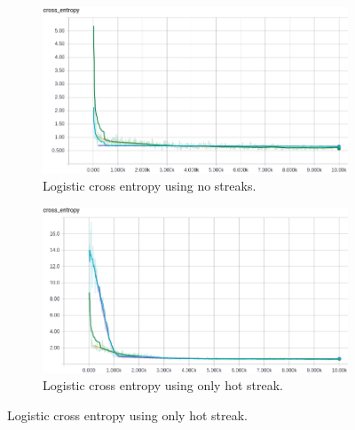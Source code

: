 \documentclass{article} %
\begin{document}
\begin{figure}[!htb]
  \begin{subfigure}{0.5\textwidth}
    \includegraphics[width=\linewidth]{plots/linear-model/streak-/crossentropy.png}
    \caption{Logistic cross entropy using no streaks.}\label{fig:linear--crossentropy}
  \end{subfigure}
  \begin{subfigure}{0.5\textwidth}
    \includegraphics[width=\linewidth]{plots/linear-model/streak-h/crossentropy.png}
    \caption{Logistic cross entropy using only hot streak.}\label{fig:linear-h-crossentropy}
  \end{subfigure}



\end{figure}
\end{document}
